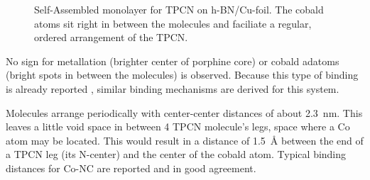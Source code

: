 \begin{figure}[!h]
 \centering
\caption{Self-Assembled monolayer for TPCN on h-BN/Cu-foil. The cobald atoms sit right in between the molecules and faciliate a regular, ordered arrangement of the TPCN.}
\end{figure}

No sign for metallation (brighter center of porphine core) or cobald adatoms (bright spots in between the molecules) is observed. Because this type of binding is already reported \cite{urgel_controlling_2015}, similar binding mechanisms are derived for this system.

Molecules arrange periodically with center-center distances of about \SI{2.3}{\nano \meter}. This leaves a little void space in between 4 TPCN molecule's legs, space where a Co atom may be located. This would result in a distance of \SI{1.5}{\angstrom} between the end of a TPCN leg (its N-center) and the center of the cobald atom. Typical binding distances for Co-NC are reported \cite{schlickum_metalorganic_2007, przychodzen_supramolecular_2006} and in good agreement.

